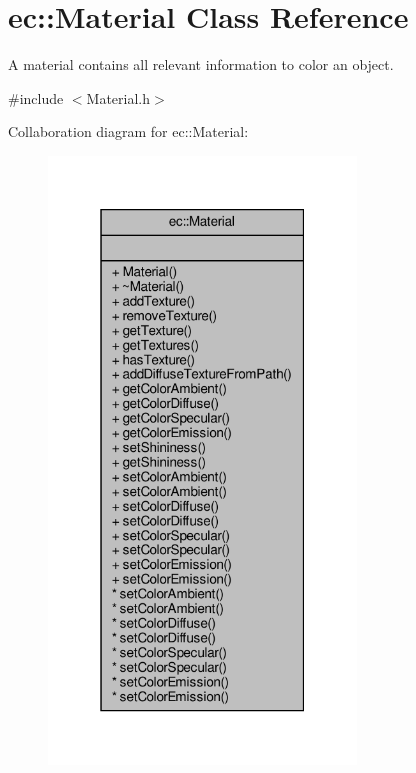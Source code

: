 \hypertarget{classec_1_1_material}{}\section{ec\+:\+:Material Class Reference}
\label{classec_1_1_material}


A material contains all relevant information to color an object.  




{\ttfamily \#include $<$Material.\+h$>$}



Collaboration diagram for ec\+:\+:Material\+:\nopagebreak
\begin{figure}[H]
\begin{center}
\leavevmode
\includegraphics[width=232pt]{classec_1_1_material__coll__graph}
\end{center}
\end{figure}
